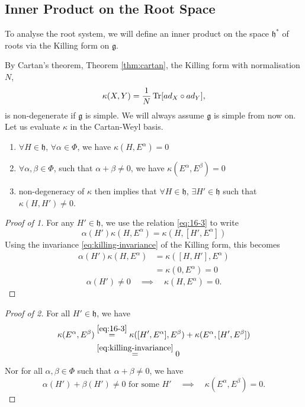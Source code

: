 \subsection{Inner Product on the Root Space}%
\label{sub:inner_product_on_the_root_space}

To analyse the root system, we will define an inner product on the space $\mathfrak{h}^*$ of roots via the Killing form on $\mathfrak{g}$.

By Cartan's theorem, Theorem \ref{thm:cartan}, the Killing form with normalisation $N$,
\begin{equation}
  \label{eq:16-4}
  \kappa(X, Y) = \frac{1}{N} \Tr[ad_X \circ ad_Y],
\end{equation}
is non-degenerate if $\mathfrak{g}$ is simple. We will always assume $\mathfrak{g}$ is simple from now on.
Let us evaluate $\kappa$ in the Cartan-Weyl basis.
\begin{claim}
  \label{cl:killingform}
  \begin{enumerate}
    \item $\forall H \in \mathfrak{h}$, $\forall \alpha \in \Phi$, we have $\kappa(H, E^{\alpha}) = 0$
    \item $\forall \alpha, \beta \in \Phi$, such that $\alpha + \beta \neq 0$, we have $\kappa(E^{\alpha}, E^{\beta}) =0$
    \item non-degeneracy of $\kappa$ then implies that $\forall H \in \mathfrak{h}$, $\exists H' \in \mathfrak{h}$ such that $\kappa(H, H') \neq 0$.
  \end{enumerate}
\end{claim}
\begin{proof}[Proof of 1]
  For any $H' \in \mathfrak{h}$, we use the relation \eqref{eq:16-3} to write
  \begin{equation}
    \alpha(H') \kappa(H, E^{\alpha}) = \kappa(H, [H', E^{\alpha} ])
  \end{equation}
  Using the invariance \eqref{eq:killing-invariance} of the Killing form, this becomes
  \begin{align}
    \alpha(H') \kappa(H, E^{\alpha}) &= \kappa ([H, H'], E^{\alpha})\\
     &= \kappa (0, E^{\alpha}) = 0
  \end{align}
  \begin{equation}
    \alpha(H') \neq 0 \quad \implies \quad \kappa(H, E^{\alpha}) = 0.
  \end{equation}
\end{proof}
\begin{proof}[Proof of 2]
  For all $H' \in \mathfrak{h}$, we have
  \begin{align}
    [\alpha(H') + \beta(H')] \kappa(E^{\alpha}, E^{\beta}) &\stackrel{\eqref{eq:16-3}}{=} \kappa([H', E^{\alpha}], E^{\beta}) + \kappa(E^{\alpha}, [H', E^{\beta}]) \\
							   &\stackrel{\eqref{eq:killing-invariance}}{=} 0
  \end{align}
  Nor for all $\alpha,\beta \in \Phi$ such that $\alpha + \beta \neq 0$, we have 
  \begin{equation}
    \alpha(H') + \beta(H') \neq 0 \text{ for some } H' \quad \implies \quad \kappa(E^{\alpha}, E^{\beta}) = 0.
  \end{equation}
\end{proof}
